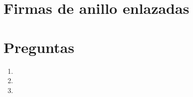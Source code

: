 \documentclass[11pt]{article}
\begin{document}



\pagebreak

\section*{Firmas de anillo enlazadas}



\section*{Preguntas}

\begin{enumerate}
    \item 
    \item 
    \item 
\end{enumerate}
\end{document}

